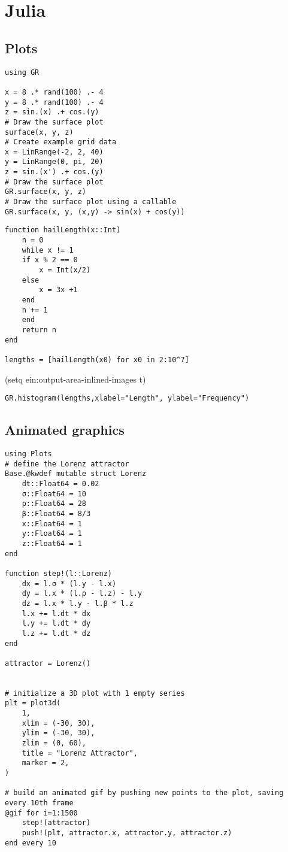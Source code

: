 \documentclass[11pt]{article}
\begin{document}
\section{Julia}
\label{sec:org522a7c4}

\subsection{Plots}
\label{sec:orgc631285}
\begin{verbatim}
using GR

x = 8 .* rand(100) .- 4
y = 8 .* rand(100) .- 4
z = sin.(x) .+ cos.(y)
# Draw the surface plot
surface(x, y, z)
# Create example grid data
x = LinRange(-2, 2, 40)
y = LinRange(0, pi, 20)
z = sin.(x') .+ cos.(y)
# Draw the surface plot
GR.surface(x, y, z)
# Draw the surface plot using a callable
GR.surface(x, y, (x,y) -> sin(x) + cos(y))
\end{verbatim}

\begin{verbatim}
function hailLength(x::Int)
    n = 0
    while x != 1
	if x % 2 == 0
	    x = Int(x/2)
	else
	    x = 3x +1
	end
	n += 1
    end
    return n
end

lengths = [hailLength(x0) for x0 in 2:10^7]

\end{verbatim}

(setq ein:output-area-inlined-images t)

\begin{verbatim}
GR.histogram(lengths,xlabel="Length", ylabel="Frequency")
\end{verbatim}

\subsection{Animated graphics}
\label{sec:orgcc2409c}
\begin{verbatim}
using Plots
# define the Lorenz attractor
Base.@kwdef mutable struct Lorenz
    dt::Float64 = 0.02
    σ::Float64 = 10
    ρ::Float64 = 28
    β::Float64 = 8/3
    x::Float64 = 1
    y::Float64 = 1
    z::Float64 = 1
end

function step!(l::Lorenz)
    dx = l.σ * (l.y - l.x)
    dy = l.x * (l.ρ - l.z) - l.y
    dz = l.x * l.y - l.β * l.z
    l.x += l.dt * dx
    l.y += l.dt * dy
    l.z += l.dt * dz
end

attractor = Lorenz()


# initialize a 3D plot with 1 empty series
plt = plot3d(
    1,
    xlim = (-30, 30),
    ylim = (-30, 30),
    zlim = (0, 60),
    title = "Lorenz Attractor",
    marker = 2,
)

# build an animated gif by pushing new points to the plot, saving every 10th frame
@gif for i=1:1500
    step!(attractor)
    push!(plt, attractor.x, attractor.y, attractor.z)
end every 10
\end{verbatim}
\end{document}
